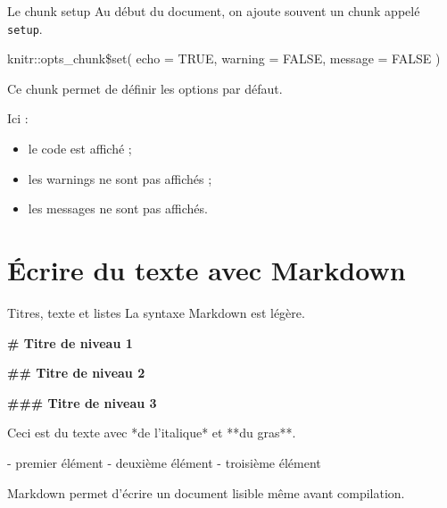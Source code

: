 \documentclass[
  10pt,
  ignorenonframetext,
]{beamer}
\newenvironment{Shaded}{\begin{snugshade}}{\end{snugshade}}
\newcommand{\FunctionTok}[1]{\textcolor[rgb]{0.13,0.29,0.53}{\textbf{#1}}}
\newcommand{\NormalTok}[1]{#1}
\newcommand{\SpecialStringTok}[1]{\textcolor[rgb]{0.31,0.60,0.02}{#1}}
\providecommand{\tightlist}{%
  \setlength{\itemsep}{0pt}\setlength{\parskip}{0pt}}
\begin{document}
\begin{frame}[fragile]{Le chunk setup}
\label{le-chunk-setup}
Au début du document, on ajoute souvent un chunk appelé \texttt{setup}.

knitr::opts\_chunk\$set( echo = TRUE, warning = FALSE, message = FALSE )

Ce chunk permet de définir les options par défaut.

Ici :

\begin{itemize}
\tightlist
\item
  le code est affiché ;
\item
  les warnings ne sont pas affichés ;
\item
  les messages ne sont pas affichés.
\end{itemize}
\end{frame}

\section{Écrire du texte avec
Markdown}\label{uxe9crire-du-texte-avec-markdown}

\begin{frame}[fragile]{Titres, texte et listes}
\label{titres-texte-et-listes}
La syntaxe Markdown est légère.

\begin{Shaded}
\begin{Highlighting}[]
\FunctionTok{\# Titre de niveau 1}

\FunctionTok{\#\# Titre de niveau 2}

\FunctionTok{\#\#\# Titre de niveau 3}

\NormalTok{Ceci est du texte avec *de l’italique* et **du gras**.}

\SpecialStringTok{{-} }\NormalTok{premier élément}
\SpecialStringTok{{-} }\NormalTok{deuxième élément}
\SpecialStringTok{{-} }\NormalTok{troisième élément}
\end{Highlighting}
\end{Shaded}

Markdown permet d'écrire un document lisible même avant compilation.
\end{frame}
\end{document}
